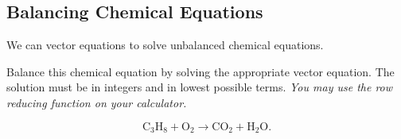 
\subsection{Balancing Chemical Equations}
\label{sub_sec:balancing_chemical_equations}

We can vector equations to solve unbalanced chemical equations.

\begin{question}
  \label{qst:balancing_chemical_equations}

  Balance this chemical equation by solving the appropriate vector equation.
  The solution must be in integers and in lowest possible terms. \textit{You
  may use the row reducing function on your calculator.}

  \[%
    \textrm{C}_{3}\textrm{H}_{8} + \textrm{O}_{2} \rightarrow \textrm{CO}_{2} + \textrm{H}_{2}\textrm{O}
  .\]%
\end{question}

